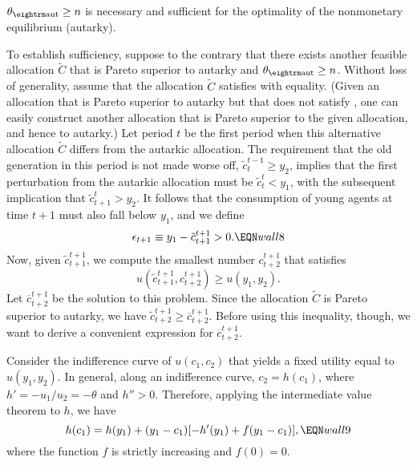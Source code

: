 \medskip
{}  $\theta_{\rm aut} \geq n$ is necessary
and sufficient for the optimality of the nonmonetary equilibrium
(autarky).
\medskip

To establish sufficiency, suppose to the contrary that there exists
another feasible allocation $\tilde C$ that is Pareto superior to
autarky and $\theta_{\rm aut} \geq n$. Without loss of generality,
assume that the allocation $\tilde C$ satisfies  with
equality. (Given an allocation that is Pareto superior to autarky but
that does not satisfy , one can easily construct another
allocation that is Pareto superior to the given allocation,
and hence to autarky.) Let period $t$ be the first
period when this alternative allocation $\tilde C$ differs from the
autarkic allocation. The requirement that the old generation in this
period is not made worse off, $\tilde c^{t-1}_t \geq y_2$, implies
that the first perturbation from the autarkic allocation must be
$\tilde c^t_t < y_1$, with the subsequent implication that
$\tilde c^t_{t+1} > y_2$. It follows that the consumption of
young agents at time $t+1$ must also fall below $y_1$, and we define
$$
\epsilon_{t+1} \equiv y_1 - \tilde c^{t+1}_{t+1} > 0.      \EQN wall8
$$
Now, given $\tilde c^{t+1}_{t+1}$, we compute the smallest number
$c^{t+1}_{t+2}$ that satisfies
$$
u(\tilde c^{t+1}_{t+1},c^{t+1}_{t+2}) \geq u(y_1,y_2).
$$
Let $\overline c^{t+1}_{t+2}$ be the solution to this problem.
Since the allocation $\tilde C$ is Pareto superior to autarky,
we have $\tilde c^{t+1}_{t+2} \geq \overline c^{t+1}_{t+2}$. Before using
this inequality, though, we want to derive a convenient expression
for $\overline c^{t+1}_{t+2}$.

Consider the indifference curve of $u(c_1,c_2)$ that yields a fixed
utility equal to $u(y_1,y_2)$.
In general, along an indifference curve, $c_2=h(c_1)$,
where $h'=-u_1/u_2=-\theta$ and $h'' > 0$. Therefore, applying the
intermediate value theorem to $h$, we have
$$
h(c_1) = h(y_1) + (y_1-c_1) [-h'(y_1) + f(y_1-c_1)],       \EQN wall9
$$
where the function $f$ is strictly increasing and $f(0)=0$.

